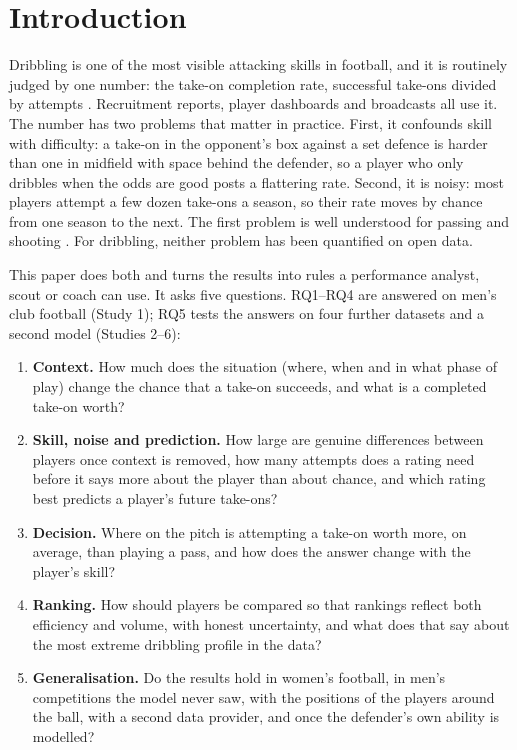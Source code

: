 \documentclass[
  12pt]{article}
\begin{document}
\newpage
{} %


\section{Introduction}\label{sec-intro}

Dribbling is one of the most visible attacking skills in football, and
it is routinely judged by one number: the take-on completion rate,
successful take-ons divided by attempts \citep{opta2025}. Recruitment
reports, player dashboards and broadcasts all use it. The number has two
problems that matter in practice. First, it confounds skill with
difficulty: a take-on in the opponent's box against a set defence is
harder than one in midfield with space behind the defender, so a player
who only dribbles when the odds are good posts a flattering rate.
Second, it is noisy: most players attempt a few dozen take-ons a season,
so their rate moves by chance from one season to the next. The first
problem is well understood for passing
\citep{szczepanski2016, power2017} and shooting
\citep{mchale2014, lucey2015, anzer2021}. For dribbling, neither problem
has been quantified on open data.

This paper does both and turns the results into rules a performance
analyst, scout or coach can use. It asks five questions. RQ1--RQ4 are
answered on men's club football (Study 1); RQ5 tests the answers on four
further datasets and a second model (Studies 2--6):

\begin{enumerate}
\def\labelenumi{\arabic{enumi}.}
\item
  \textbf{Context.} How much does the situation (where, when and in what
  phase of play) change the chance that a take-on succeeds, and what is
  a completed take-on worth?
\item
  \textbf{Skill, noise and prediction.} How large are genuine
  differences between players once context is removed, how many attempts
  does a rating need before it says more about the player than about
  chance, and which rating best predicts a player's future take-ons?
\item
  \textbf{Decision.} Where on the pitch is attempting a take-on worth
  more, on average, than playing a pass, and how does the answer change
  with the player's skill?
\item
  \textbf{Ranking.} How should players be compared so that rankings
  reflect both efficiency and volume, with honest uncertainty, and what
  does that say about the most extreme dribbling profile in the data?
\item
  \textbf{Generalisation.} Do the results hold in women's football, in
  men's competitions the model never saw, with the positions of the
  players around the ball, with a second data provider, and once the
  defender's own ability is modelled?
\end{enumerate}
\end{document}

